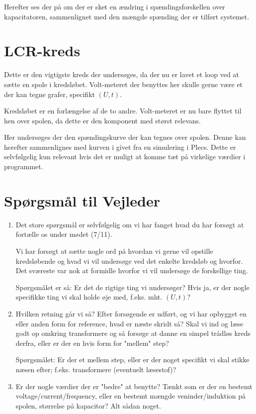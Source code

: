Herefter ses der på om der er sket en ændring i spændingsforskellen over kapacitatoren, sammenlignet med den mængde spænding der er tilført systemet.
\section{LCR-kreds}
Dette er den vigtigste kreds der undersøges, da der nu er lavet et loop ved at sætte en spole i kredsløbet. Volt-meteret der benyttes her skulle gerne være et der kan tegne grafer, specifikt $(U,t)$.

Kredsløbet er en forlængelse af de to andre. Volt-meteret er nu bare flyttet til hen over spolen, da dette er den komponent med størst relevans.

Her undersøges der den spændingskurve der kan tegnes over spolen. Denne kan herefter sammenlignes med kurven i givet fra en simulering i Plecs. Dette er selvfølgelig kun relevant hvis det er muligt at komme tæt på virkelige værdier i programmet.
\newpage

\section{Spørgsmål til Vejleder}
\begin{enumerate}
\item Det store spørgsmål er selvfølgelig om vi har fanget hvad du har forsøgt at fortælle os under mødet (7/11).

Vi har forsøgt at sætte nogle ord på hvordan vi gerne vil opstille kredsløbende og hvad vi vil undersøge ved det enkelte kredsløb og hvorfor. Det sværeste var nok at formidle hvorfor vi vil undersøge de forskellige ting.

Spørgsmålet er så: Er det de rigtige ting vi undersøger? Hvis ja, er der nogle specifikke ting vi skal holde øje med, f.eks. mht. $(U,t)$?

\item Hvilken retning går vi så? Efter forsøgende er udført, og vi har opbygget en eller anden form for reference, hvad er næste skridt så? Skal vi ind og læse godt op omkring transformere og så forsøge at danne en simpel trådløs kreds derfra, eller er der en hvis form for "mellem" step?

Spørgsmålet: Er der et mellem step, eller er der noget specifikt vi skal stikke næsen efter; f.eks. transformere (eventuelt læsestof)?

\item Er der nogle værdier der er "bedre" at benytte? Tænkt som er der en bestemt voltage/current/frequency, eller en bestemt mængde veninder/induktion på spolen, størrelse på kapacitor? Alt sådan noget.

\end{enumerate}
